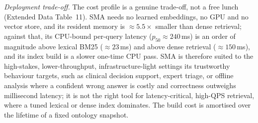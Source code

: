 \documentclass[pdflatex,sn-nature]{sn-jnl}
\begin{document}
\textit{Deployment trade-off.} The cost profile is a genuine trade-off, not a free
lunch (Extended Data Table~11). SMA needs no learned embeddings, no GPU and no
vector store, and its resident memory is $\approx 5.5\times$ smaller than dense
retrieval; against that, its CPU-bound per-query latency ($p_{50}\approx 240$\,ms)
is an order of magnitude above lexical BM25 ($\approx 23$\,ms) and above dense
retrieval ($\approx 150$\,ms), and its index build is a slower one-time CPU pass.
SMA is therefore suited to the high-stakes, lower-throughput, infrastructure-light
settings its trustworthy behaviour targets, such as clinical decision support,
expert triage, or offline analysis where a confident wrong answer is costly and
correctness outweighs millisecond latency; it is not the right tool for
latency-critical, high-QPS retrieval, where a tuned lexical or dense index
dominates. The build cost is amortised over the lifetime of a fixed ontology
snapshot.
\end{document}
